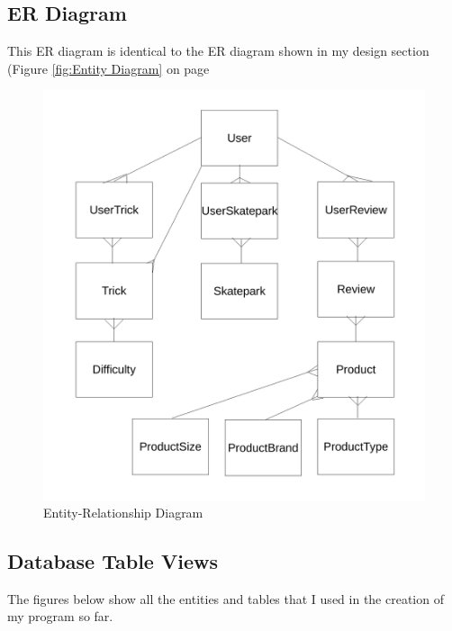 \subsection{ER Diagram}

This ER diagram is identical to the ER diagram shown in my design section (Figure \ref{fig:Entity Diagram} on page \pageref{fig:Entity Diagram}

\begin{figure}[H]
    \includegraphics[width=\textwidth]{./Design/EntityRelationships2.pdf}
    \caption{Entity-Relationship Diagram} \label{fig:Entity Diagram2}
\end{figure}







\subsection{Database Table Views}

The figures below show all the entities and tables that I used in the creation of my program so far.

